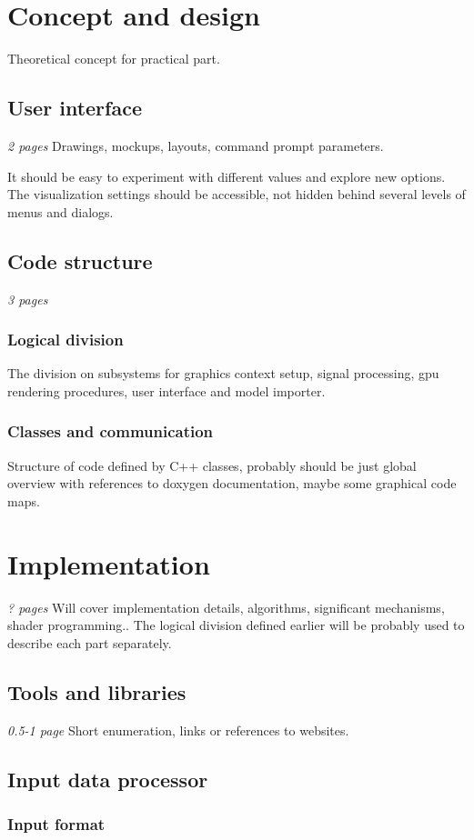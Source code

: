 \chapter{Concept and design}
Theoretical concept for practical part.
\section{User interface}
\emph{2 pages}
Drawings, mockups, layouts, command prompt parameters.

It should be easy to experiment with different values and explore new options.
The visualization settings should be accessible, not hidden behind several
levels of menus and dialogs.
\section{Code structure}
\emph{3 pages}
\subsection{Logical division}
The division on subsystems for graphics context setup, signal processing, gpu
rendering procedures, user interface and model importer.
\subsection{Classes and communication}
Structure of code defined by C++ classes, probably should be just global
overview with references to doxygen documentation, maybe some graphical code
maps.
\chapter{Implementation}
\emph{? pages}
Will cover implementation details, algorithms, significant mechanisms, shader
programming.. The logical division defined earlier will be probably used to
describe each part separately.
\section{Tools and libraries}
\emph{0.5-1 page}
Short enumeration, links or references to websites.
\section{Input data processor}
\subsection{Input format}
